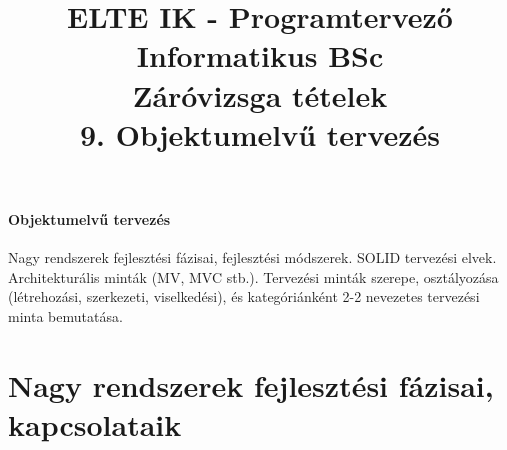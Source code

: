 \documentclass[margin=0px]{article}
\title{\textbf{{\Large ELTE IK - Programtervező Informatikus BSc} \vspace{0.2cm} \\ {\huge Záróvizsga tételek}} \vspace{0.3cm} \\ 9. Objektumelvű tervezés}
\author{}
\date{}
\newenvironment{tetel}[1]{\paragraph{#1 \\}}{}
\begin{document}
\maketitle

\begin{tetel}{Objektumelvű tervezés}
    Nagy rendszerek fejlesztési fázisai, fejlesztési módszerek. SOLID tervezési elvek. Architekturális minták (MV, MVC stb.). Tervezési minták szerepe, osztályozása (létrehozási, szerkezeti, viselkedési), és kategóriánként 2-2 nevezetes tervezési minta bemutatása.
\end{tetel}

\section{Nagy rendszerek fejlesztési fázisai, kapcsolataik}
\end{document}
